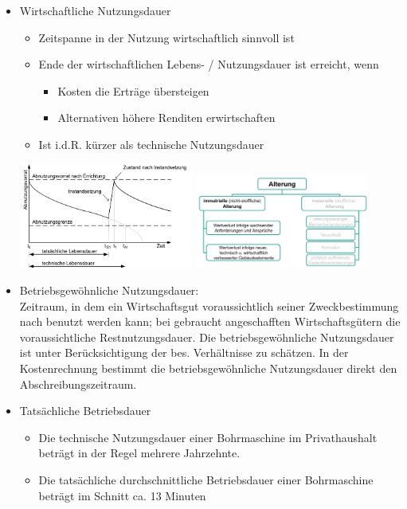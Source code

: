 \documentclass[fleqn,twoside,dvipsnames]{article}
\begin{document}
\begin{itemize}
            \item Wirtschaftliche Nutzungsdauer
                \begin{itemize}
                    \item Zeitspanne in der Nutzung wirtschaftlich sinnvoll ist
                    \item Ende der wirtschaftlichen Lebens- / Nutzungsdauer ist erreicht, wenn
                        \begin{itemize}
                            \item Kosten die Erträge übersteigen
                            \item Alternativen höhere Renditen erwirtschaften
                        \end{itemize}
                    \item Ist i.d.R. kürzer als technische Nutzungsdauer
                \end{itemize}
                \includegraphics[width=0.45\textwidth]{Grafiken/Lebensdauer und Abnutzung von Bauteilen/Wirtschaftliche Nutzungsdauer.png}
                \includegraphics[width=0.45\textwidth]{Grafiken/Lebensdauer und Abnutzung von Bauteilen/Wirtschaftliche Alterung.png}
            \item Betriebsgewöhnliche Nutzungsdauer:\\
                Zeitraum, in dem ein Wirtschaftsgut voraussichtlich seiner Zweckbestimmung nach benutzt werden kann; bei gebraucht angeschafften Wirtschaftsgütern die voraussichtliche Restnutzungsdauer. Die betriebsgewöhnliche Nutzungsdauer ist unter Berücksichtigung der bes. Verhältnisse zu schätzen. In der Kostenrechnung bestimmt die betriebsgewöhnliche Nutzungsdauer direkt den Abschreibungszeitraum.
            \item Tatsächliche Betriebsdauer
                \begin{itemize}
                    \item Die technische Nutzungsdauer einer Bohrmaschine im Privathaushalt beträgt in der Regel mehrere Jahrzehnte.
                    \item Die tatsächliche durchschnittliche Betriebsdauer einer Bohrmaschine beträgt im Schnitt ca. 13 Minuten
                \end{itemize}


\end{itemize}
\end{document}
